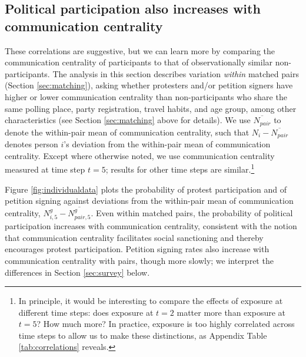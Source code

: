 \documentclass[12pt]{article}
\newcommand{\StepCountInText}{5} %
\begin{document}






\subsection{Political participation also increases with communication centrality}\label{sec:t2}

These correlations are suggestive, but we can learn more by comparing the communication centrality of participants to that of observationally similar non-parti\-cipants. The analysis in this section describes variation \emph{within} matched pairs (Section \ref{sec:matching}), asking whether protesters and/or petition signers have higher or lower communication centrality than non-participants who share the same polling place, party registration, travel habits, and age group, among other characteristics (see Section \ref{sec:matching} above for details). We use $\overline{N_{pair}}$ to denote the within-pair mean of communication centrality, such that $N_{i}-\overline{N_{pair}}$ denotes person $i$'s deviation from the within-pair mean of communication centrality. Except where otherwise noted, we use communication centrality measured at time step $t=\StepCountInText$; results for other time steps are similar.\footnote{In principle, it would be interesting to compare the effects of exposure at different time steps: does exposure at $t=2$ matter more than exposure at $t=5$? How much more? In practice, exposure is too highly correlated across time steps to allow us to make these distinctions, as Appendix Table \ref{tab:correlations} reveals.}

Figure \ref{fig:individualdata} plots the probability of protest participation and of petition signing against deviations from the within-pair mean of communication centrality,  $N_{i,\StepCountInText}^g-\overline{N_{pair,\StepCountInText}^g}$. Even within matched pairs, the probability of political participation increases with communication centrality, consistent with the notion that communication centrality facilitates social sanctioning and thereby encourages protest participation. Petition signing rates also increase with communication centrality with pairs, though more slowly; we interpret the differences in Section \ref{sec:survey} below.
\end{document}
